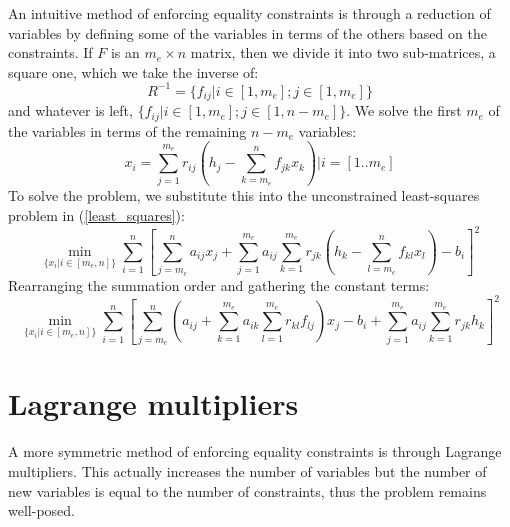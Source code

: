 \documentclass{article}
\newcommand{\sol}{b}
\newcommand{\eqmat}{F}
\newcommand{\eqvec}{h}
\newcommand{\coord}{x}
\newcommand{\matEl}{a}
\newcommand{\eqmatEl}{f}
\newcommand{\inveqsubmat}{R}
\newcommand{\inveqsubmatEl}{r}
\begin{document}
An intuitive method of enforcing equality constraints is through a reduction
of variables by defining some of the variables in terms of the others based
on the constraints.
If $\eqmat$ is an $m_e \times n$ matrix, then we divide it into two sub-matrices,
a square one, which we take the inverse of:
\begin{equation}
	\inveqsubmat^{-1} = \lbrace \eqmatEl_{ij} | i \in [1, m_e]; j \in [1, m_e] \rbrace
\end{equation}
and whatever is left, $\lbrace \eqmatEl_{ij} | i \in [1, m_e]; j \in [1, n-m_e] \rbrace$.
We solve the first $m_e$ of the variables in terms of the remaining $n-m_e$ variables:
\begin{equation}
	\coord_i=\sum_{j=1}^{m_e} \inveqsubmatEl_{ij} \left ( \eqvec_j - \sum_{k=m_e}^n \eqmatEl_{jk} \coord_k \right ) | i =[1..m_e]
\end{equation}
To solve the problem, we substitute this into the unconstrained least-squares
problem in (\ref{least_squares}):
\begin{equation}
	\min_{\lbrace x_i|i \in [m_e, n] \rbrace} \sum_{i=1}^n \left [ \sum_{j=m_e}^n \matEl_{ij} \coord_j + \sum_{j=1}^{m_e} \matEl_{ij} \sum_{k=1}^{m_e} \inveqsubmatEl_{jk} \left ( \eqvec_k - \sum_{l=m_e}^n \eqmatEl_{kl} \coord_l \right ) - \sol_i \right ]^2
\end{equation}
Rearranging the summation order and gathering the constant terms:
\begin{equation}
	\min_{\lbrace x_i|i \in [m_e, n] \rbrace} \sum_{i=1}^n \left [ \sum_{j=m_e}^n \left ( \matEl_{ij} + \sum_{k=1}^{m_e} \matEl_{ik} \sum_{l=1}^{m_e} \inveqsubmatEl_{kl} \eqmatEl_{lj} \right ) \coord_j 
	- \sol_i + \sum_{j=1}^{m_e} \matEl_{ij} \sum_{k=1}^{m_e} \inveqsubmatEl_{jk} \eqvec_k \right ]^2
\end{equation}
	
\section{Lagrange multipliers}

A more symmetric method of enforcing equality constraints is through Lagrange
multipliers.
This actually increases the number of variables but the number of new variables
is equal to the number of constraints, thus the problem remains well-posed.
\end{document}
